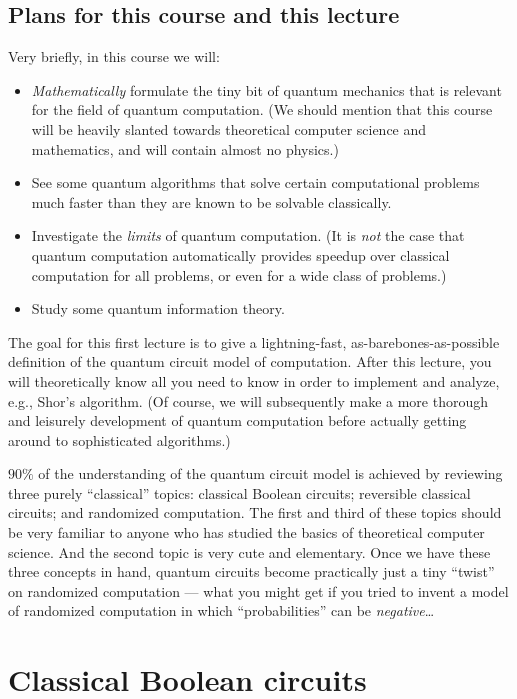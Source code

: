 \documentclass[12pt]{article}
\begin{document}
\subsection{Plans for this course and this lecture}

Very briefly, in this course we will:
\begin{itemize}
    \item \emph{Mathematically} formulate the tiny bit of quantum mechanics that is relevant for the field of quantum computation.  (We should mention that this course will be heavily slanted towards theoretical computer science and mathematics, and will contain almost no physics.)
    \item See some quantum algorithms that solve certain computational problems much faster than they are known to be solvable classically.
    \item Investigate the \emph{limits} of quantum computation.  (It is \emph{not} the case that quantum computation automatically provides speedup over classical computation for all problems, or even for a wide class of problems.)
    \item Study some quantum information theory.
\end{itemize}

The goal for this first lecture is to give a lightning-fast, as-barebones-as-possible definition of the quantum circuit model of computation.  After this lecture, you will theoretically know all you need to know in order to implement and analyze, e.g., Shor's algorithm.  (Of course, we will subsequently make a more thorough and leisurely development of quantum computation before actually getting around to sophisticated algorithms.)

$90\%$ of the understanding of the quantum circuit model is achieved by reviewing three purely ``classical'' topics: classical Boolean circuits; reversible classical circuits; and randomized computation.  The first and third of these topics should be very familiar to anyone who has studied the basics of theoretical computer science.  And the second topic is very cute and elementary. Once we have these three concepts in hand, quantum circuits become practically just a tiny ``twist'' on randomized computation --- what you might get if you tried to invent a model of randomized computation in which ``probabilities'' can be \emph{negative}\dots

\section{Classical Boolean circuits}
\end{document}
